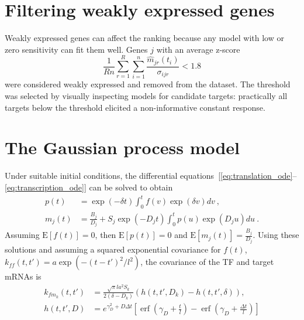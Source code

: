 \documentclass{pnastwo}
\newcommand{\erf}{\operatorname{erf}}
\begin{document}
\begin{article}
\begin{materials}
  \section{Filtering weakly expressed genes}
  Weakly expressed genes can affect the ranking because any model
  with low or zero sensitivity can fit them
  well. Genes $j$ with an average z-score 
  $$ \frac{1}{Rn} \sum_{r=1}^R \sum_{i=1}^n \frac{\hat{m}_{jr}(t_i)}{\sigma_{ijr}} < 1.8 $$
  were considered weakly expressed and removed from the dataset.  The threshold
  was selected by visually inspecting models for candidate targets:
  practically all targets below the threshold elicited a
  non-informative constant response. %
  
  \section{The Gaussian process model}
  Under suitable initial conditions, the differential
  equations~[\ref{eq:translation_ode}--\ref{eq:transcription_ode}]
  can be solved to obtain
  \begin{align}
    \label{eq:gpsim_f_ode_sol}
    p(t) &= \exp(-\delta t) \int_0^t f(v) \exp(\delta v) dv\ , \\
    m_j(t) &= \frac{B_j}{D_j} + S_j \exp(-D_j t) \int_0^t p(u)
    \exp(D_j u) du\ .
    \label{eq:gpsim_f_x_sol}
  \end{align}
  Assuming $\mathrm{E}[f(t)]=0$, then $\mathrm{E}[p(t)]=0$ and
  $\mathrm{E}[m_j(t)]=\frac{B_j}{D_j}$.
  Using these solutions and assuming a squared exponential covariance
  for $f(t)$, $k_{ff}(t, t') = a \exp( -(t-t')^2/l^2)$, the covariance
  of the TF and target mRNAs is
  \begin{align*}
    k_{f m_k}(t, t')
    &= \frac{\sqrt{\pi} l a^2 S_k}{2(\delta - D_k)}
    \left(h(t, t', D_k) - h(t, t', \delta) \right),\\
    h(t, t', D) &= e^{\gamma_D^2 + D \Delta t}
     \left[\erf\left(\gamma_D + \frac{t}{l}\right) 
       - \erf\left(\gamma_D + \frac{\Delta t}{l}\right)\right] \\
  \end{align*}

\end{materials}
\end{article}
\end{document}
